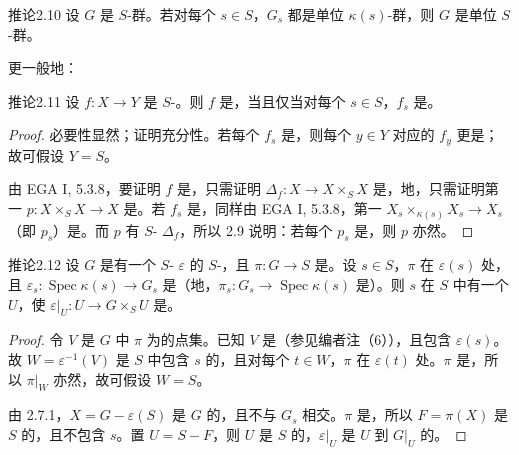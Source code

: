 \begin{SGAresult}{推论}{2.10}
设 $G$ 是 $S$-群。若对每个 $s\in S$，$G_s$ 都是单位 $\kappa(s)$-群，则 $G$ 是单位 $S$-群。
\end{SGAresult}
更一般地：
\begin{SGAresult}{推论}{2.11}
设 $f:X\to Y$ 是 $S$-。则 $f$ 是，当且仅当对每个 $s\in S$，$f_s$ 是。
\end{SGAresult}
\begin{proof}
必要性显然；证明充分性。若每个 $f_s$ 是，则每个 $y\in Y$ 对应的 $f_y$ 更是；故可假设 $Y=S$。

由 EGA I, 5.3.8，要证明 $f$ 是，只需证明 $\Delta_f:X\to X\times_SX$ 是，地，只需证明第一 $p:X\times_SX\to X$ 是。若 $f_s$ 是，同样由 EGA I, 5.3.8，第一 $X_s\times_{\kappa(s)}X_s\to X_s$（即 $p_s$）是。而 $p$ 有 $S$- $\Delta_f$，所以 2.9 说明：若每个 $p_s$ 是，则 $p$ 亦然。
\end{proof}
\begin{SGAresult}{推论}{2.12}
设 $G$ 是有一个 $S$- $\varepsilon$ 的 $S$-，且 $\pi:G\to S$ 是。设 $s\in S$，$\pi$ 在 $\varepsilon(s)$ 处，且 $\varepsilon_s:\operatorname{Spec}\kappa(s)\to G_s$ 是（地，$\pi_s:G_s\to\operatorname{Spec}\kappa(s)$ 是）。则 $s$ 在 $S$ 中有一个 $U$，使 $\varepsilon|_U:U\to G\times_SU$ 是。
\end{SGAresult}
\begin{proof}
令 $V$ 是 $G$ 中 $\pi$ 为的点集。已知 $V$ 是（参见编者注（6）），且包含 $\varepsilon(s)$。故 $W=\varepsilon^{-1}(V)$ 是 $S$ 中包含 $s$ 的，且对每个 $t\in W$，$\pi$ 在 $\varepsilon(t)$ 处。$\pi$ 是，所以 $\pi|_W$ 亦然，故可假设 $W=S$。

由 2.7.1，$X=G-\varepsilon(S)$ 是 $G$ 的，且不与 $G_s$ 相交。$\pi$ 是，所以 $F=\pi(X)$ 是 $S$ 的，且不包含 $s$。置 $U=S-F$，则 $U$ 是 $S$ 的，$\varepsilon|_U$ 是 $U$ 到 $G|_U$ 的。
\end{proof}

